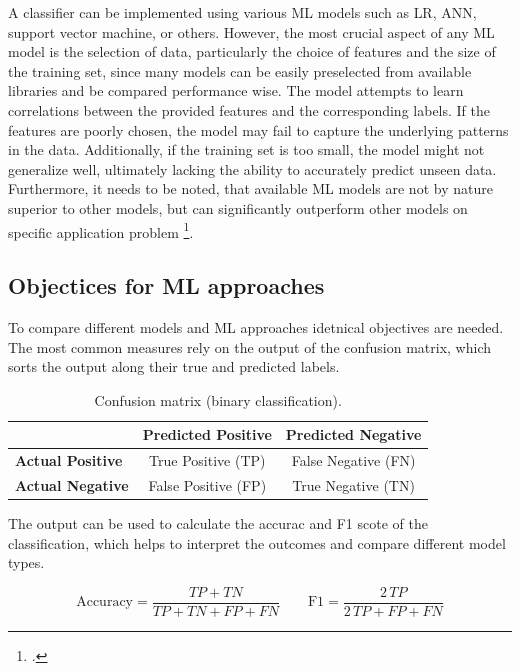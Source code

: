 A classifier can be implemented using various \gls{ML} models such as \gls{LR},
\gls{ANN}, support vector machine, or others. However, the most crucial aspect of any
\gls{ML} model is the selection of data, particularly the choice of features and
the size of the training set, since many models can be easily preselected from available
libraries and be compared performance wise. The model attempts to learn correlations between the provided features
and the corresponding labels. If the features are poorly chosen, the model may fail
to capture the underlying patterns in the data. Additionally, if the training set
is too small, the model might not generalize well, ultimately lacking the ability
to accurately predict unseen data. Furthermore, it needs to be noted, that available
\gls{ML} models are not by nature superior to other models, but can significantly outperform
other models on specific application problem \footcite[cf.][pp. 250, 264]{kotsiantis_supervised_2007}.


\subsection{Objectices for ML approaches}
To compare different models and \gls{ML} approaches idetnical objectives are needed. The most common
measures rely on the output of the confusion matrix, which sorts the output along
their true and predicted labels.

\begin{table}[ht]
    \centering
    \begin{tabular}{@{}lcc@{}}
        \toprule
                                 & \textbf{Predicted Positive} & \textbf{Predicted Negative} \\
        \midrule
        \textbf{Actual Positive} & True Positive (TP)          & False Negative (FN)         \\
        \textbf{Actual Negative} & False Positive (FP)         & True Negative (TN)          \\
        \bottomrule
    \end{tabular}
    \caption{Confusion matrix (binary classification).}
    \label{tab:confusion_matrix}
\end{table}
The output can be used to calculate the accurac and F1 scote of the classification, which
helps to interpret the outcomes and compare different model types.

\[
    \text{Accuracy}=\frac{TP+TN}{TP+TN+FP+FN}
    \qquad
    \text{F1}=\frac{2\,TP}{2\,TP+FP+FN}
\]



